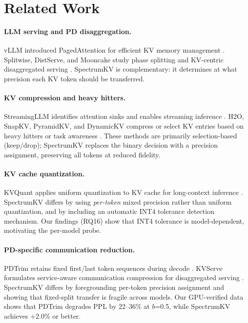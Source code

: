 \documentclass[11pt]{article}
\newcommand{\method}{SpectrumKV}
\newcommand{\pct}{\%}
\theoremstyle{definition}
\theoremstyle{plain}
\begin{document}
\section{Related Work}
\label{sec:related}

\paragraph{LLM serving and PD disaggregation.}
vLLM introduced PagedAttention for efficient KV memory management \citep{vllm}.  Splitwise, DistServe, and Mooncake study phase splitting and KV-centric disaggregated serving \citep{splitwise,distserve,mooncake}.  \method{} is complementary: it determines at what precision each KV token should be transferred.

\paragraph{KV compression and heavy hitters.}
StreamingLLM identifies attention sinks and enables streaming inference \citep{streamingllm}.  H2O, SnapKV, PyramidKV, and DynamicKV compress or select KV entries based on heavy hitters or task awareness \citep{h2o,snapkv,pyramidkv,dynamickv}.  These methods are primarily selection-based (keep/drop); \method{} replaces the binary decision with a precision assignment, preserving all tokens at reduced fidelity.

\paragraph{KV cache quantization.}
KVQuant applies uniform quantization to KV cache for long-context inference \citep{kvquant}.  \method{} differs by using \emph{per-token} mixed precision rather than uniform quantization, and by including an automatic INT4 tolerance detection mechanism.  Our findings (RQ16) show that INT4 tolerance is model-dependent, motivating the per-model probe.

\paragraph{PD-specific communication reduction.}
PDTrim retains fixed first/last token sequences during decode \citep{pdtrim}.  KVServe formulates service-aware communication compression for disaggregated serving \citep{kvserve}.  \method{} differs by foregrounding per-token precision assignment and showing that fixed-split transfer is fragile across models.  Our GPU-verified data shows that PDTrim degrades PPL by 22--36\pct{} at $b$=0.5, while \method{} achieves +2.0\pct{} or better.
\end{document}
